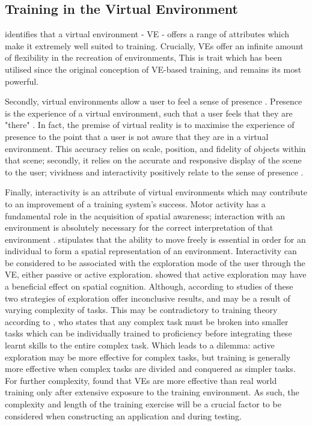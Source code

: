 \documentclass[a4paper, openright, twoside]{book}
\begin{document}
\subsection{Training in the Virtual Environment}
\citet{osberg} identifies that a virtual environment - VE - offers a range of attributes which make it extremely well suited to training. Crucially, VEs offer an infinite amount of flexibility in the recreation of environments, This is trait which has been utilised since the original conception of VE-based training, and remains its most powerful. 

Secondly, virtual environments allow a user to feel a sense of presence \citep{osberg}. Presence is the experience of a virtual environment, such that a user feels that they are "there" \citep{steuer}. In fact, the premise of virtual reality is to maximise the experience of presence to the point that a user is not aware that they are in a virtual environment. This accuracy relies on scale, position, and fidelity  of objects within that scene; secondly, it relies on the accurate and responsive display of the scene to the user; vividness and interactivity positively relate to the sense of presence \citep{steuer}.

Finally, interactivity is an attribute of virtual environments which may contribute to an improvement of a training system's success. Motor activity has a fundamental role in the acquisition of spatial awareness; interaction with an environment is absolutely necessary for the correct interpretation of that environment \citep{siegel}. \cite{osberg} stipulates that the ability to move freely is essential in order for an individual to form a spatial representation of an environment. Interactivity can be considered to be associated with the exploration mode of the user through the VE, either passive or active exploration. \cite{wallet} showed that active exploration may have a beneficial effect on spatial cognition. Although, according to \cite{wallet} studies of these two strategies of exploration offer inconclusive results, and may be a result of varying complexity of tasks. This may be contradictory to training theory according to \cite{goldstein}, who states that any complex task must be broken into smaller tasks which can be individually trained to proficiency before integrating these learnt skills to the entire complex task. Which leads to a dilemma: active exploration may be more effective for complex tasks, but training is generally more effective when complex tasks are divided and conquered as simpler tasks. For further complexity, \cite{waller} found that VEs are more effective than real world training only after extensive exposure to the training environment. As such, the complexity and length of the training exercise will be a crucial factor to be considered when constructing an application and during testing. 
\end{document}
